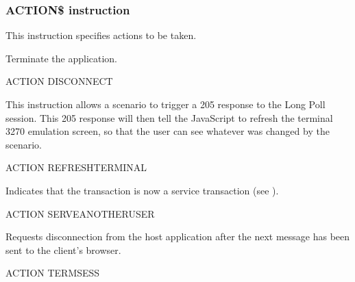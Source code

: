 \documentclass[letterpaper,10pt,english]{sphinxmanual}
\begin{document}
\subsubsection{ACTION\$ instruction}
\label{\detokenize{User_Guide:action-instruction}}
This instruction specifies actions to be taken.


Terminate the application.

\begin{sphinxVerbatim}[commandchars=\\\{\}]
ACTION\PYGZdl{} DISCONNECT
\end{sphinxVerbatim}


This instruction allows a scenario to trigger a 205 response to the Long Poll session.
This 205 response will then tell the JavaScript to refresh the terminal 3270 emulation screen, so that the user can see
whatever was changed by the scenario.

\begin{sphinxVerbatim}[commandchars=\\\{\}]
ACTION\PYGZdl{} REFRESH\PYGZhy{}TERMINAL
\end{sphinxVerbatim}
\label{\detokenize{User_Guide:v457ug-action-serve-another-users}}

Indicates that the transaction is now a service transaction (see {\hyperref[\detokenize{User_Guide:v457ug-service-transactions}]{}}).

\begin{sphinxVerbatim}[commandchars=\\\{\}]
ACTION\PYGZdl{} SERVE\PYGZhy{}ANOTHER\PYGZhy{}USER
\end{sphinxVerbatim}


Requests disconnection from the host application after the next message has been sent to the client’s browser.

\begin{sphinxVerbatim}[commandchars=\\\{\}]
ACTION\PYGZdl{} TERMSESS
\end{sphinxVerbatim}

\end{document}

